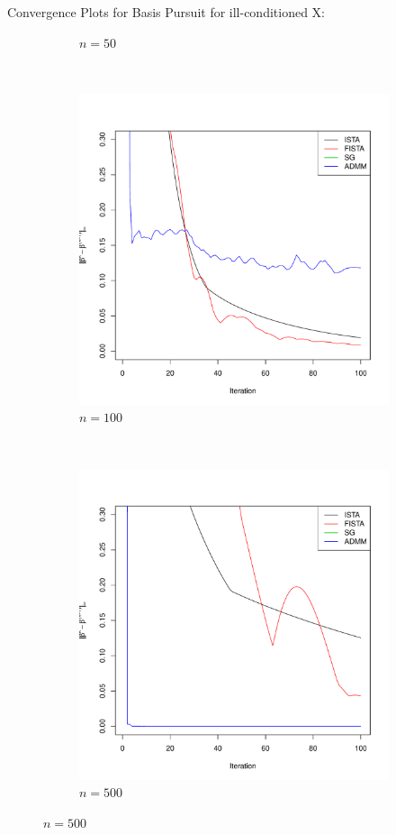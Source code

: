 \documentclass[xcolor=dvipsnames,aspectratio=1610]{beamer}
\theoremstyle{remark}
\begin{document}
\begin{frame}{Convergence Plots for Basis Pursuit for ill-conditioned X:}
\begin{figure}[H]
\begin{subfigure}[b]{0.2\textwidth}
        \caption{$n=50$}
        \label{fig:50}
    \end{subfigure}
\\
    \begin{subfigure}[b]{0.2\textwidth}
        \includegraphics[width=\textwidth]{100cvgc-cn.pdf}
        \caption{$n=100$}
        \label{fig:100}
    \end{subfigure}
~
    \begin{subfigure}[b]{0.2\textwidth}
        \includegraphics[width=\textwidth]{500cvgc-cn.pdf}
        \caption{$n=500$}
        \label{fig:500}
    \end{subfigure}
\label{fig:cvgc}
\end{figure}
\end{frame}
\end{document}
